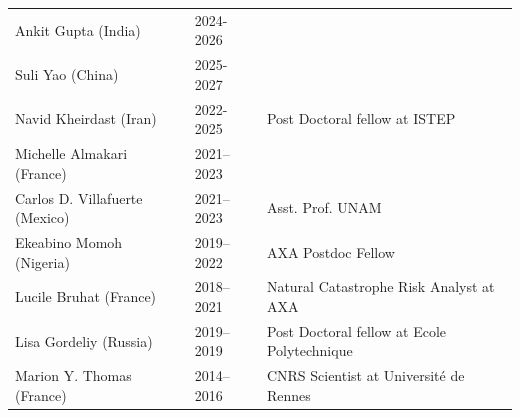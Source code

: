 \documentclass[10pt]{article}
\begin{document}
\begin{table}[h!]
 \renewcommand{\arraystretch}{0.5}

 
\begin{tabular}{L{6cm}L{2cm}D{7cm}}
\color{groy}Ankit Gupta (India)           & 2024-2026      &  \\
\color{groy}Suli Yao (China)              & 2025-2027      &  \\
\color{black}Navid Kheirdast (Iran)    	  & 2022-2025      &  Post Doctoral fellow at ISTEP\\
\color{black}Michelle Almakari (France)    & 2021–2023  &  \\
\color{black}Carlos D. Villafuerte (Mexico)   & 2021–2023  &  Asst. Prof. UNAM\\
\color{black}Ekeabino Momoh (Nigeria)   	  & 2019–2022  &  AXA Postdoc Fellow\\
\color{black}Lucile Bruhat (France)   	  & 2018–2021  &  Natural Catastrophe Risk Analyst at AXA\\
\color{black}Lisa Gordeliy (Russia)   	  & 2019–2019  &  Post Doctoral fellow at Ecole Polytechnique\\
\color{black}Marion Y. Thomas (France) 	  & 2014–2016  &  CNRS Scientist at Université de Rennes\\[16pt]
\end{tabular}



\end{table}
\end{document}
